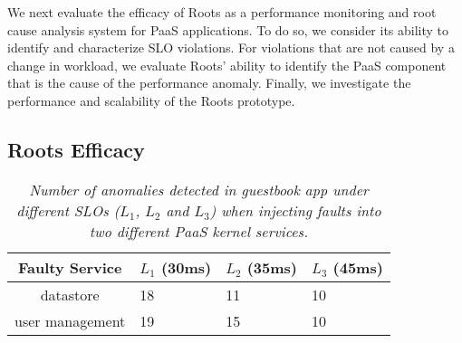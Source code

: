 We next evaluate the efficacy of Roots as a performance monitoring and root cause
analysis system for PaaS applications.
To do so, we consider its ability to identify and characterize SLO violations.
For violations that are not caused by a change in workload, we evaluate Roots' ability to identify
the PaaS component that is the cause of the performance anomaly.
Finally, we investigate the performance and scalability of the Roots
prototype. 


\subsection{Roots Efficacy}

\begin{table}
{\footnotesize
\begin{center}
\begin{tabular}{|c|p{1cm}|p{1cm}|p{1cm}|}
\hline
Faulty Service & $L_1$ (30ms) & $L_2$ (35ms) & $L_3$ (45ms) \\ \hline
datastore & 18 & 11 & 10 \\ \hline
user management & 19 & 15 & 10 \\ \hline
\end{tabular}
\end{center}
}
\vspace{-0.2in}
\caption{\textit{Number of anomalies detected in guestbook app under different SLOs 
($L_1$, $L_2$ and $L_3$) when injecting faults into two different PaaS kernel services.
\label{tab:anomaly_counts}
}}
\vspace{-0.2in}
\end{table}

